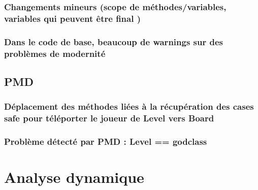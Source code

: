 \documentclass[12pt, openany]{report}
\begin{document}
\subsubsection{Changements mineurs (\og scope \fg de méthodes/variables, variables qui peuvent être \og final \fg)}
\subsubsection{Dans le code de base, beaucoup de \og warnings \fg sur des \og problèmes de modernité \fg}

\subsection{PMD}
\subsubsection{Déplacement des méthodes liées à la récupération des cases \og safe \fg pour téléporter le joueur de Level vers Board}
\subsubsection{Problème détecté par PMD : Level == godclass}
\section{Analyse dynamique}
\end{document}
